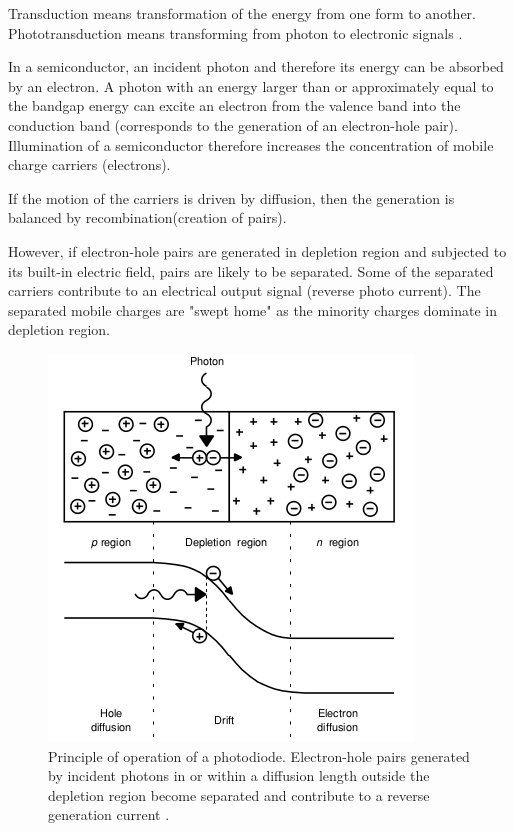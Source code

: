 \documentclass[main]{subfiles}
\begin{document}
Transduction means transformation of the energy from one form to another. Phototransduction means transforming from photon to electronic signals \cite{lab8}.

In a semiconductor, an incident photon and therefore its energy can be absorbed by an electron. A
photon with an energy larger than or approximately equal to the bandgap energy can excite an electron from the valence band into the conduction band
(corresponds to the generation of an electron-hole pair). Illumination of a semiconductor therefore increases the concentration of mobile charge carriers (electrons). 

If the motion of the carriers is driven by diffusion, then the
generation is balanced by recombination(creation of pairs).

However, if electron-hole pairs are generated in depletion region and subjected to its built-in electric field, pairs are likely to be separated.  
Some of the separated carriers contribute to an electrical output signal (reverse photo current). The separated mobile charges are "swept home" as the minority charges dominate in depletion region. 

\begin{figure}[htbp]
  \centering
  \includegraphics[scale=0.8]{figs/photodiode_principle.jpg}
  \caption{Principle of operation of a photodiode. Electron-hole pairs generated by incident photons in or
within a diffusion length outside the depletion region become separated and contribute to a reverse
generation current \cite{book:VLSI}.}
  \label{fig:photodiode_principle}
\end{figure} 
\end{document}
